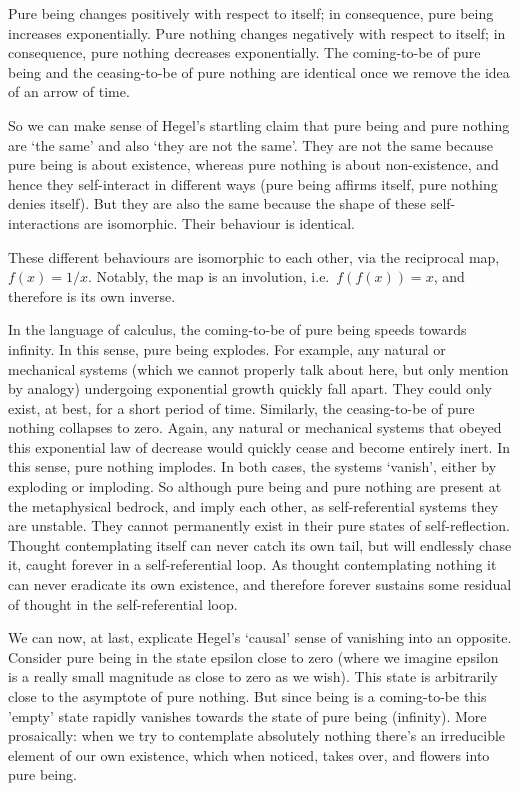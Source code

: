 \documentclass[
]{book}
\begin{document}
Pure being changes positively with respect to itself; in consequence, pure being increases exponentially.
Pure nothing changes negatively with respect to itself; in consequence, pure nothing decreases exponentially.
The coming-to-be of pure being and the ceasing-to-be of pure nothing are identical once we remove the idea of an arrow of time.

So we can make sense of Hegel's startling claim that pure being and pure nothing are `the same' and also `they are not the same'. They are not the same because pure being is about existence, whereas pure nothing is about non-existence, and hence they self-interact in different ways (pure being affirms itself, pure nothing denies itself). But they are also the same because the shape of these self-interactions are isomorphic. Their behaviour is identical.

These different behaviours are isomorphic to each other, via the reciprocal map,
\(f(x)=1/x\). Notably, the map is an involution, i.e.~\(f(f(x))=x\),
and therefore is its own inverse.

In the language of calculus, the coming-to-be of pure being speeds towards infinity. In this sense, pure being explodes. For example, any natural or mechanical systems (which we cannot properly talk about here, but only mention by analogy) undergoing exponential growth quickly fall apart. They could only exist, at best, for a short period of time. Similarly, the ceasing-to-be of pure nothing collapses to zero. Again, any natural or mechanical systems that obeyed this exponential law of decrease would quickly cease and become entirely inert. In this sense, pure nothing implodes. In both cases, the systems `vanish', either by exploding or imploding. So although pure being and pure nothing are present at the metaphysical bedrock, and imply each other, as self-referential systems they are unstable. They cannot permanently exist in their pure states of self-reflection.
Thought contemplating itself can never catch its own tail, but will endlessly chase it, caught forever in a self-referential loop.
As thought contemplating nothing it can never eradicate its own existence, and therefore forever sustains some residual of thought in the self-referential loop.

We can now, at last, explicate Hegel's `causal' sense of vanishing into an opposite. Consider pure being in the state epsilon close to zero (where we imagine epsilon is a really small magnitude as close to zero as we wish). This state is arbitrarily close to the asymptote of pure nothing. But since being is a coming-to-be this 'empty' state rapidly vanishes towards the state of pure being (infinity). More prosaically: when we try to contemplate absolutely nothing there's an irreducible element of our own existence, which when noticed, takes over, and flowers into pure being.
\end{document}
